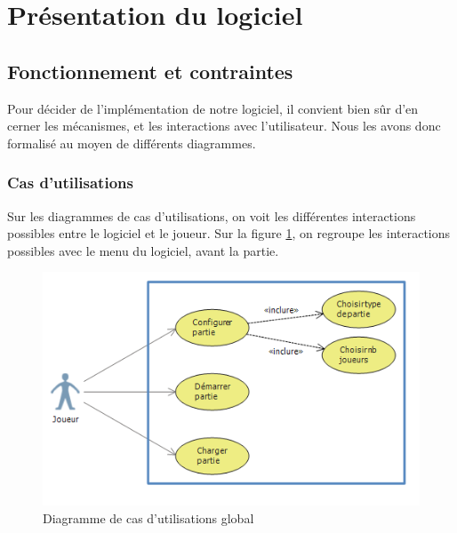 \section{Présentation du logiciel}

\subsection{Fonctionnement et contraintes}
Pour décider de l'implémentation de notre logiciel, il convient bien sûr d'en cerner les mécanismes, et les interactions avec l'utilisateur. Nous les avons donc formalisé au moyen de différents diagrammes.

\subsubsection{Cas d'utilisations}
Sur les diagrammes de cas d'utilisations, on voit les différentes interactions possibles entre le logiciel et le joueur. Sur la figure \ref{casdut1}, on regroupe les interactions possibles avec le menu du logiciel, avant la partie. 

\begin{figure}[!h] 
\centerline{\includegraphics[width=\textwidth]{img/ucd_ihm_menus.png}}
   \caption{\label{étiquette} Diagramme de cas d'utilisations global}
\label{casdut1}
\end{figure}

